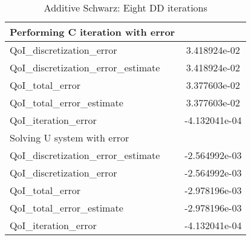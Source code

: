 \begin{table}[H]
\begin{center}
\begin{tabular}{||l|c||}
\hline
Performing C iteration with error    & \\
\hline
QoI\_discretization\_error           &  3.418924e-02  \\
QoI\_discretization\_error\_estimate &  3.418924e-02  \\
QoI\_total\_error                    &  3.377603e-02  \\
QoI\_total\_error\_estimate          &  3.377603e-02  \\
QoI\_iteration\_error                & -4.132041e-04  \\
\hline
Solving U system with error          & \\
\hline
QoI\_discretization\_error\_estimate & -2.564992e-03  \\
QoI\_discretization\_error           & -2.564992e-03  \\
QoI\_total\_error                    & -2.978196e-03  \\
QoI\_total\_error\_estimate          & -2.978196e-03  \\
QoI\_iteration\_error                & -4.132041e-04  \\
\hline
\end{tabular}
\end{center}
\caption{Additive Schwarz: Eight DD iterations}
\label{tab:AS_8}
\end{table}






